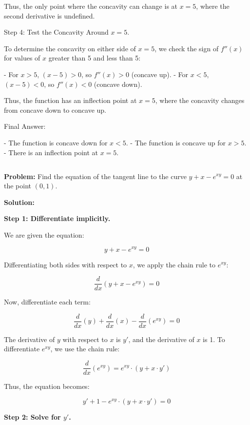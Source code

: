 \documentclass{article}
\begin{document}
Thus, the only point where the concavity can change is at \( x = 5 \), where the second derivative is undefined.

Step 4: Test the Concavity Around \( x = 5 \).

To determine the concavity on either side of \( x = 5 \), we check the sign of \( f''(x) \) for values of \( x \) greater than 5 and less than 5:

- For \( x > 5 \), \( (x - 5) > 0 \), so \( f''(x) > 0 \) (concave up).
- For \( x < 5 \), \( (x - 5) < 0 \), so \( f''(x) < 0 \) (concave down).

Thus, the function has an inflection point at \( x = 5 \), where the concavity changes from concave down to concave up.

Final Answer:

- The function is concave down for \( x < 5 \).
- The function is concave up for \( x > 5 \).
- There is an inflection point at \( x = 5 \).


\subsection{}	

\textbf{Problem:} Find the equation of the tangent line to the curve \(y + x - e^{xy} = 0\) at the point \((0, 1)\).

\textbf{Solution:}

\textbf{Step 1: Differentiate implicitly.}

We are given the equation:

\[
y + x - e^{xy} = 0
\]

Differentiating both sides with respect to \(x\), we apply the chain rule to \(e^{xy}\):

\[
\frac{d}{dx} \left( y + x - e^{xy} \right) = 0
\]

Now, differentiate each term:

\[
\frac{d}{dx}(y) + \frac{d}{dx}(x) - \frac{d}{dx}(e^{xy}) = 0
\]

The derivative of \(y\) with respect to \(x\) is \(y'\), and the derivative of \(x\) is 1. To differentiate \(e^{xy}\), we use the chain rule:

\[
\frac{d}{dx}(e^{xy}) = e^{xy} \cdot \left( y + x \cdot y' \right)
\]

Thus, the equation becomes:

\[
y' + 1 - e^{xy} \cdot \left( y + x \cdot y' \right) = 0
\]

\textbf{Step 2: Solve for \(y'\).}
\end{document}
